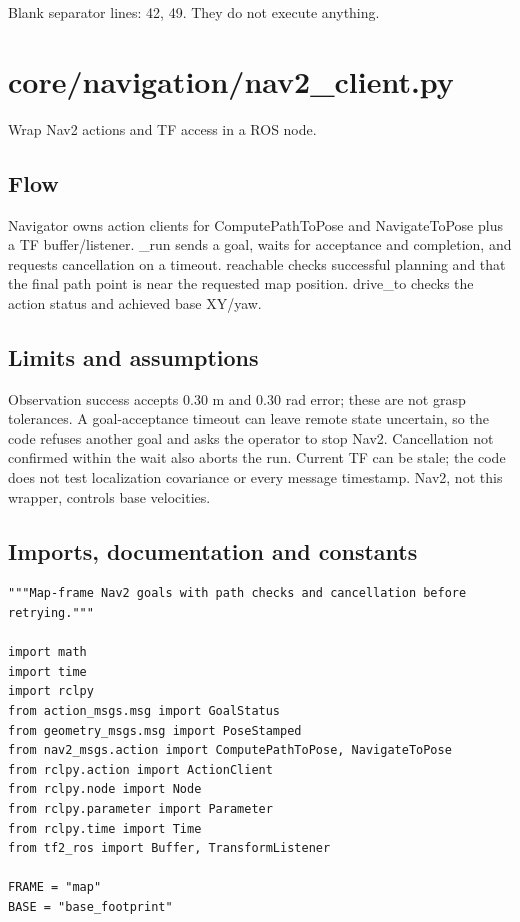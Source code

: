 \documentclass[11pt,a4paper]{book}
\begin{document}
Blank separator lines: 42, 49. They do not execute anything.

\chapter{core/navigation/nav2\_client.py}

Wrap Nav2 actions and TF access in a ROS node.

\section*{Flow}

Navigator owns action clients for ComputePathToPose and NavigateToPose plus a TF buffer/listener. \_run sends a goal, waits for acceptance and completion, and requests cancellation on a timeout. reachable checks successful planning and that the final path point is near the requested map position. drive\_to checks the action status and achieved base XY/yaw.

\section*{Limits and assumptions}

Observation success accepts 0.30 m and 0.30 rad error; these are not grasp tolerances. A goal-acceptance timeout can leave remote state uncertain, so the code refuses another goal and asks the operator to stop Nav2. Cancellation not confirmed within the wait also aborts the run. Current TF can be stale; the code does not test localization covariance or every message timestamp. Nav2, not this wrapper, controls base velocities.

\section{Imports, documentation and constants}

\begin{lstlisting}[firstnumber=1]
"""Map-frame Nav2 goals with path checks and cancellation before retrying."""

import math
import time
import rclpy
from action_msgs.msg import GoalStatus
from geometry_msgs.msg import PoseStamped
from nav2_msgs.action import ComputePathToPose, NavigateToPose
from rclpy.action import ActionClient
from rclpy.node import Node
from rclpy.parameter import Parameter
from rclpy.time import Time
from tf2_ros import Buffer, TransformListener

FRAME = "map"
BASE = "base_footprint"


\end{lstlisting}
\end{document}
